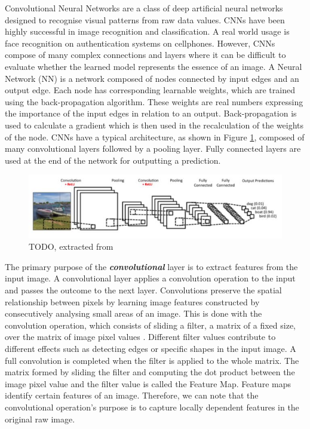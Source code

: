 Convolutional Neural Networks \cite{lecun2015deep} are a class of deep artificial neural networks designed to recognise visual patterns from raw data values. CNNs have been highly successful in image recognition and classification. A real world usage is face recognition on authentication systems on cellphones. However, CNNs compose of many complex connections and layers where it can be difficult to evaluate whether the learned model represents the essence of an image. A Neural Network (NN) \cite{haykin2004comprehensive} is a network composed of nodes connected by input edges and an output edge. Each node has corresponding learnable weights, which are trained using the back-propagation algorithm. These weights are real numbers expressing the importance of the input edges in relation to an output.  Back-propagation is used to calculate a gradient which is then used in the recalculation of the weights of the node. CNNs have a typical architecture, as shown in Figure \ref{fig:cnnlayers}, composed of many convolutional layers followed by a pooling layer. Fully connected layers are used at the end of the network for outputting a prediction.

\begin{figure}[H]
	\begin{center}
		\includegraphics[width=150mm, scale=1]{cnn.JPG}
		\caption{TODO, extracted from \cite{mordvintsev2015inceptionism}}
		\label{fig:cnnlayers}
	\end{center}
\end{figure}

The primary purpose of the \textbf{\textit{convolutional}} layer is to extract features from the input image. A convolutional layer applies a convolution operation to the input and passes the outcome to the next layer. Convolutions preserve the spatial relationship between pixels by learning image features constructed by consecutively analysing small areas of an image. This is done with the convolution operation, which consists of sliding a filter, a matrix of a fixed size, over the matrix of image pixel values \cite{cnnsliding}. Different filter values contribute to different effects such as detecting edges or specific shapes in the input image. A full convolution is completed when the filter is applied to the whole matrix. The matrix formed by sliding the filter and computing the dot product between the image pixel value and the filter value is called the Feature Map.  Feature maps identify certain features of an image. Therefore, we can note that the convolutional operation's purpose is to capture locally dependent features in the original raw image. 

